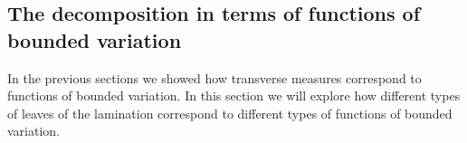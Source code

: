 \documentclass{ip-journal}
\theoremstyle{definition}
\newenvironment{linebundle}%
{{\sc Proof of Theorem~\ref{conversetomeasure}.}}%
{{\sc q.e.d.} \\}
\numberwithin{equation}{section}
\newcommand{\R}{\mathbb R}
\begin{document}
%
% 
% 

\subsection{The decomposition in terms of functions of bounded variation}
In the previous sections we showed how transverse measures  correspond to  functions of bounded variation. In this section we will explore how different types of leaves of the lamination correspond to different types of functions of bounded variation. 
\end{document}
